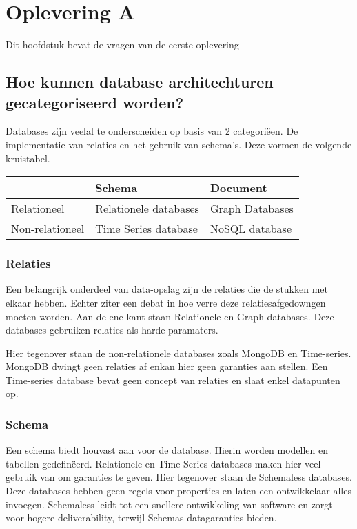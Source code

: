 \chapter{Oplevering A}

Dit hoofdstuk bevat de vragen van de eerste oplevering

\section{Hoe kunnen database architechturen gecategoriseerd worden?}

Databases zijn veelal te onderscheiden op basis van 2 categori\"een. De implementatie van relaties en het gebruik van schema's. Deze vormen de volgende kruistabel. \\

\begin{tabular}{ |l|l|l| }
	\hline
	& Schema & Document \\ \hline
	Relationeel & Relationele databases & Graph Databases \\ \hline
	Non-relationeel & Time Series database & NoSQL database \\\hline
\end{tabular}

\subsection{Relaties}

Een belangrijk onderdeel van data-opslag zijn de relaties die de stukken met elkaar hebben. Echter ziter een debat in hoe verre deze relatiesafgedowngen moeten worden. Aan de ene kant staan Relationele en Graph databases. Deze databases gebruiken relaties  als harde paramaters. \cite{graphdbs}

Hier tegenover staan de non-relationele databases zoals MongoDB en Time-series. MongoDB dwingt geen relaties af enkan hier geen garanties aan stellen. Een Time-series database bevat geen concept van relaties en slaat enkel datapunten op.

\subsection{Schema}

Een schema biedt houvast aan voor de database. Hierin worden modellen en tabellen gedefin\"eerd. Relationele en Time-Series databases maken hier veel gebruik van om garanties te geven. Hier tegenover staan de Schemaless databases. Deze databases hebben geen regels voor properties en laten een ontwikkelaar alles invoegen.
Schemaless leidt tot een snellere ontwikkeling van software en zorgt voor hogere deliverability, terwijl Schemas datagaranties bieden.

